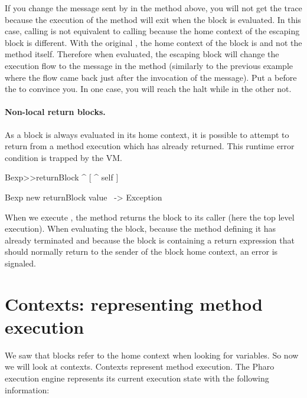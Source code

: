 \documentclass[a4paper,10pt,twoside]{book}
\begin{document}
If you change the  message sent by  in the  method above, you will not get the trace because the execution of the method  will exit when the block is evaluated. In this case, calling  is not equivalent to calling  because the home context of the escaping block \ct{[ ^ nil ]} is different.  With the original , the home context of the block \ct{[^ nil]}
is  and not the method  itself.
Therefore when evaluated, the escaping block will change the execution flow to the  message in the method  (similarly to the previous example where the flow came back just after the invocation of the  message). Put a  before the  to convince you. In one case, you will reach the halt while in the other not.

\paragraph{Non-local return blocks.} As a block is always evaluated in its home context, it is possible to attempt to return from a method execution which has already returned. This runtime error condition is trapped by the VM.

\begin{code}{}
Bexp>>returnBlock
	^ [ ^ self ]

Bexp new returnBlock value ~-> Exception
\end{code}

When we execute , the method returns the block to its caller (here the top level execution). When evaluating the block, because the method defining it has already terminated and because the block is containing a return expression that should normally   return to the sender of the block home context, an error is signaled.






\section{Contexts: representing method execution}
We saw that blocks refer to the home context when looking for variables. So now we will look at contexts. Contexts represent method execution. The Pharo execution engine represents its current execution state with the following information:
\end{document}
